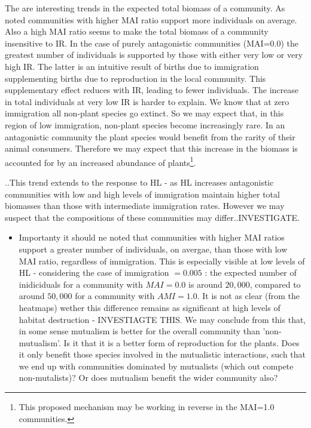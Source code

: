 \begin{itemize}
The are interesting trends in the expected total biomass of a community. As noted communities with higher MAI ratio support more individuals on average. Also a high MAI ratio seems to make the total biomass of a community insensitive to IR. In the case of purely antagonistic communities (MAI=0.0) the greatest number of individuals is supported by those with either very low or very high IR. The latter is an intuitive result of births due to immigration supplementing births due to reproduction in the local community. This supplementary effect reduces with IR, leading to fewer individuals. The increase in total individuals at very low IR is harder to explain. We know that at zero immigration all non-plant species go extinct. So we may expect that, in this region of low immigration, non-plant species become increasingly rare. In an antagonistic community the plant species would benefit from the rarity of their animal consumers. Therefore we may expect that this increase in the biomass is accounted for by an increased abundance of plants\footnote{This proposed mechanism may be working in reverse in the MAI=1.0 communities.}.   

 ..This trend extends to the response to HL - as HL increases antagonistic communities with low and high levels of immigration maintain higher total biomasses than those with intermediate immigration rates. However we may suspect that the compositions of these communities may differ..INVESTIGATE.



\begin{itemize}	
	
	\item Importanty it should ne noted that communities with higher MAI ratios support a greater number of individuals, on avergae, than those with low MAI ratio, regardless of immigration. This is especially visible at low levels of HL - considering the case of immigration $= 0.005$ : the expected number of inidiciduals for a community with $MAI=0.0$ is around $20,000$, compared to around $50,000$ for a community with $AMI=1.0$. It is not as clear (from the heatmaps) wether this difference remains as significant at high levels of habitat destruction - INVESTIAGTE THIS. We may conclude from this that, in some sense mutualism is better for the overall community than 'non-mutualism'. Is it that it is a better form of reproduction for the plants. Does it only benefit those species involved in the mutualistic interactions, such that we end up with communities dominated by mutualists (which out compete non-mutalists)? Or does mutualism benefit the wider community also?
	

\end{itemize}
\end{itemize}

